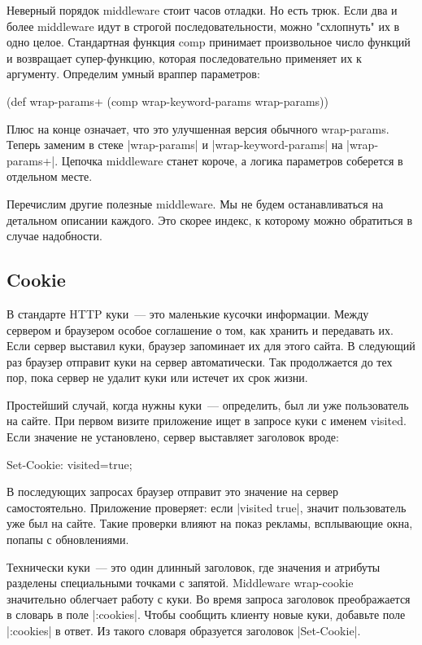 Неверный порядок middleware стоит часов отладки. Но есть трюк. Если два и более
middleware идут в строгой последовательности, можно "схлопнуть" их в одно
целое. Стандартная функция comp принимает произвольное число функций и
возвращает супер-функцию, которая последовательно применяет их к
аргументу. Определим умный враппер параметров:

\begin{code}
(def wrap-params+
  (comp wrap-keyword-params wrap-params))
\end{code}

Плюс на конце означает, что это улучшенная версия обычного wrap-params. Теперь
заменим в стеке \spverb|wrap-params| и \spverb|wrap-keyword-params| на \spverb|wrap-params+|. Цепочка
middleware станет короче, а логика параметров соберется в отдельном месте.

Перечислим другие полезные middleware. Мы не будем останавливаться на детальном
описании каждого. Это скорее индекс, к которому можно обратиться в случае
надобности.

\subsection{Cookie}

В стандарте HTTP куки~--- это маленькие кусочки информации. Между сервером и
браузером особое соглашение о том, как хранить и передавать их. Если сервер
выставил куки, браузер запоминает их для этого сайта. В следующий раз браузер
отправит куки на сервер автоматически. Так продолжается до тех пор, пока сервер
не удалит куки или истечет их срок жизни.

Простейший случай, когда нужны куки~--- определить, был ли уже пользователь на
сайте. При первом визите приложение ищет в запросе куки с именем visited. Если
значение не установлено, сервер выставляет заголовок вроде:

\begin{code}
Set-Cookie: visited=true;
\end{code}

В последующих запросах браузер отправит это значение на сервер
самостоятельно. Приложение проверяет: если \spverb|visited true|, значит пользователь
уже был на сайте. Такие проверки влияют на показ рекламы, всплывающие окна,
попапы с обновлениями.

Технически куки~--- это один длинный заголовок, где значения и атрибуты разделены
специальными точками с запятой. Middleware wrap-cookie значительно облегчает
работу с куки. Во время запроса заголовок преображается в словарь в поле
\spverb|:cookies|. Чтобы сообщить клиенту новые куки, добавьте поле \spverb|:cookies| в
ответ. Из такого словаря образуется заголовок \spverb|Set-Cookie|.

